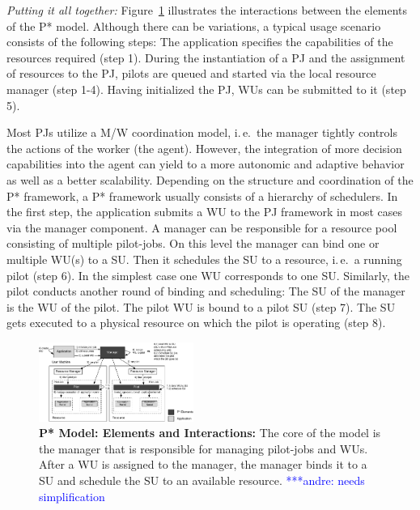 \documentclass[conference,final]{IEEEtran}
\newcommand{\jhanote}[1]{ {\textcolor{red} { ***shantenu: #1 }}}
\newcommand{\alnote}[1]{ {\textcolor{blue} { ***andre: #1 }}}
\newcommand{\msnote}[1]{ {\textcolor{cyan} { ***mark: #1 }}}
\newcommand{\alnote}[1]{}
\newcommand{\jhanote}[1]{}
\newcommand{\msnote}[1]{}
\newcommand{\up}{\vspace*{-1em}}
\newcommand{\upp}{\vspace*{-0.5em}}
\begin{document}



{\it Putting it all together:} Figure~\ref{fig:figures_pstar}
illustrates the interactions between the elements of the P*
model. Although there can be variations, a typical usage scenario
consists of the following steps: The application specifies the
capabilities of the resources required (step 1). During the
instantiation of a PJ and the assignment of resources to the PJ,
pilots are queued and started via the local resource manager (step
1-4). Having initialized the PJ, WUs can be submitted to it (step 5).


Most PJs utilize a M/W coordination model, i.\,e.\ the manager tightly controls
the actions of the worker (the agent). However, the integration of more decision
capabilities into the agent can yield to a more autonomic and adaptive behavior
as well as a better scalability. Depending on the structure and coordination of
the P* framework, a P* framework usually consists of a hierarchy of schedulers.
In the first step, the application submits a WU to the PJ framework in most
cases via the manager component. A manager can be responsible for a resource
pool consisting of multiple pilot-jobs. On this level the manager can bind one
or multiple WU(s) to a SU. Then it schedules the SU to a resource, i.\,e.\ a 
running pilot (step 6). In the simplest case one WU corresponds to one SU. 
Similarly, the pilot conducts another round of binding and scheduling: The SU of 
the manager is the WU of the pilot. The pilot WU is bound to a pilot SU (step 
7). The SU gets executed to a physical resource on which the pilot is operating 
(step 8).

\begin{figure}[htbp]
    \centering\up
    \includegraphics[width=0.45\textwidth]{figures/pstar_model_multi.pdf}
    \caption{
      \textbf{P* Model: Elements and Interactions:} The core of
      the model is the manager that is responsible for managing
      pilot-jobs and WUs. After a WU is assigned to the manager, the manager
      binds it to a SU and schedule the SU to an available
      resource. \alnote{needs simplification}
      \upp\upp}
    \label{fig:figures_pstar}
\end{figure}
\end{document}
